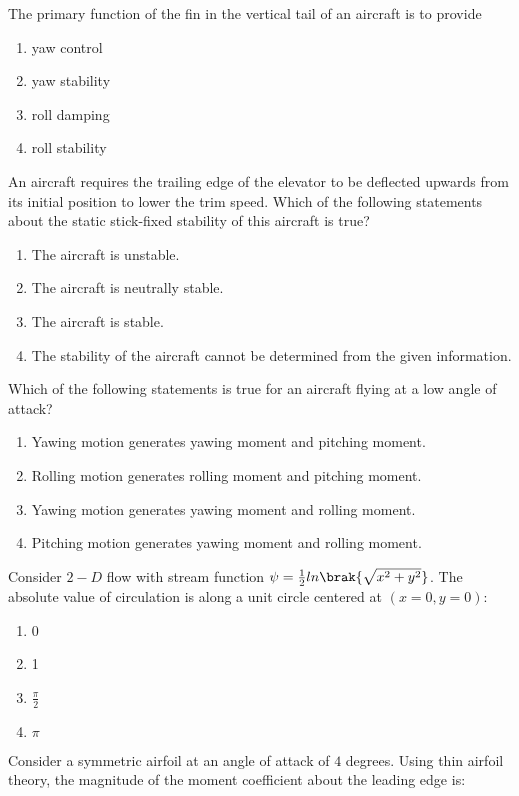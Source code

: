 \item The primary function of the fin in the vertical tail of an aircraft is to provide
\begin{enumerate}
    \item yaw control
    \item yaw stability
    \item roll damping
    \item roll stability
\end{enumerate}
\item An aircraft requires the trailing edge of the elevator to be deflected upwards from its initial position to lower the trim speed. Which of the following statements about the static stick-fixed stability of this aircraft is true?
\begin{enumerate}
    \item The aircraft is unstable.
    \item The aircraft is neutrally stable.
    \item The aircraft is stable.
    \item The stability of the aircraft cannot be determined from the given information.
\end{enumerate}
\item Which of the following statements is true for an aircraft flying at a low angle of attack?
\begin{enumerate}
    \item Yawing motion generates yawing moment and pitching moment.
    \item Rolling motion generates rolling moment and pitching moment.
    \item Yawing motion generates yawing moment and rolling moment.
    \item Pitching motion generates yawing moment and rolling moment.
\end{enumerate}
\item Consider $2-D$ flow with stream function $\psi = \frac{1}{2}ln\brak{\sqrt{x^2+y^2}}$. The absolute value of circulation is along a unit circle centered at $(x = 0, y = 0)$:
\begin{enumerate}
    \item 0
    \item 1
    \item $\frac{\pi}{2}$
    \item $\pi$
\end{enumerate}
\item Consider a symmetric airfoil at an angle of attack of $4$ degrees. Using thin airfoil theory, the magnitude of the moment coefficient about the leading edge is:

